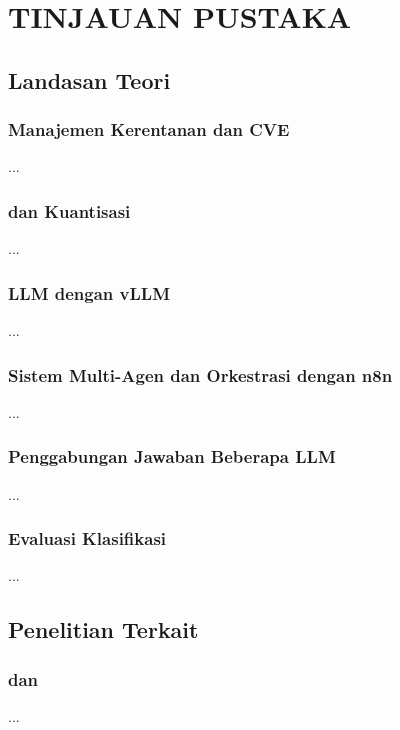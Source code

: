 \chapter{TINJAUAN PUSTAKA}
\label{bab:tinjauan}

\section{Landasan Teori}
\label{sec:teori}
\subsection{Manajemen Kerentanan dan CVE}
...
\subsection{ dan Kuantisasi}
...
\subsection{ LLM dengan vLLM}
...
\subsection{Sistem Multi-Agen dan Orkestrasi dengan n8n}
...
\subsection{Penggabungan Jawaban Beberapa LLM}
...
\subsection{Evaluasi Klasifikasi}
...

\section{Penelitian Terkait}
\label{sec:penelitian-terkait}
\subsection{ dan }
...
